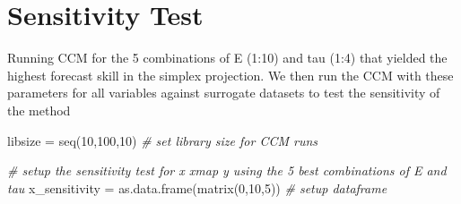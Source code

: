 \documentclass[
]{article}
\newenvironment{Shaded}{\begin{snugshade}}{\end{snugshade}}
\newcommand{\CommentTok}[1]{\textcolor[rgb]{0.56,0.35,0.01}{\textit{#1}}}
\newcommand{\DecValTok}[1]{\textcolor[rgb]{0.00,0.00,0.81}{#1}}
\newcommand{\FunctionTok}[1]{\textcolor[rgb]{0.00,0.00,0.00}{#1}}
\newcommand{\NormalTok}[1]{#1}
\newcommand{\OtherTok}[1]{\textcolor[rgb]{0.56,0.35,0.01}{#1}}
\begin{document}
\hypertarget{sensitivity-test}{%
\section{Sensitivity Test}\label{sensitivity-test}}

Running CCM for the 5 combinations of E (1:10) and tau (1:4) that
yielded the highest forecast skill in the simplex projection. We then
run the CCM with these parameters for all variables against surrogate
datasets to test the sensitivity of the method

\begin{Shaded}
\begin{Highlighting}[]
\NormalTok{libsize }\OtherTok{=} \FunctionTok{seq}\NormalTok{(}\DecValTok{10}\NormalTok{,}\DecValTok{100}\NormalTok{,}\DecValTok{10}\NormalTok{) }\CommentTok{\# set library size for CCM runs}

\CommentTok{\# setup the sensitivity test for x xmap y using the 5 best combinations of E and tau}
\NormalTok{x\_sensitivity }\OtherTok{=} \FunctionTok{as.data.frame}\NormalTok{(}\FunctionTok{matrix}\NormalTok{(}\DecValTok{0}\NormalTok{,}\DecValTok{10}\NormalTok{,}\DecValTok{5}\NormalTok{)) }\CommentTok{\# setup dataframe }


\end{Highlighting}
\end{Shaded}
\end{document}
